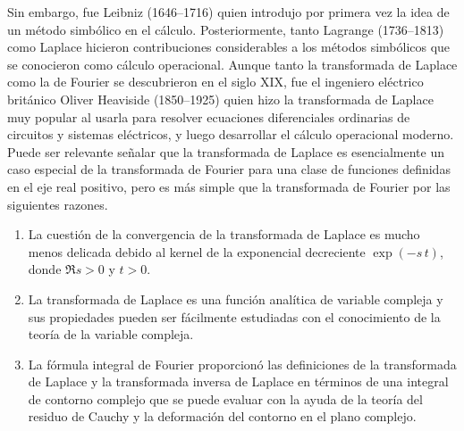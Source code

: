 \par
Sin embargo, fue Leibniz (1646–1716) quien introdujo por primera vez la idea de un método simbólico en el cálculo. Posteriormente, tanto Lagrange (1736–1813) como Laplace hicieron contribuciones considerables a los métodos simbólicos que se conocieron como cálculo operacional. Aunque tanto la transformada de Laplace como la de Fourier se descubrieron en el siglo XIX, fue el ingeniero eléctrico británico Oliver Heaviside (1850–1925) quien hizo la transformada de Laplace muy popular al usarla para resolver ecuaciones diferenciales ordinarias de circuitos y sistemas eléctricos, y luego desarrollar el cálculo operacional moderno. Puede ser relevante señalar que la transformada de Laplace es esencialmente un caso especial de la transformada de Fourier para una clase de funciones definidas en el eje real positivo, pero es más simple que la transformada de Fourier por las siguientes razones.
\begin{enumerate}
\item La cuestión de la convergencia de la transformada de Laplace es mucho menos delicada debido al kernel de la exponencial decreciente $\exp (-s \, t)$, donde $\Re{s} > 0$ y $t > 0$.
\item La transformada de Laplace es una función analítica de variable compleja y sus propiedades pueden ser fácilmente estudiadas con el conocimiento de la teoría de la variable compleja.
\item La fórmula integral de Fourier proporcionó las definiciones de la transformada de Laplace y la transformada inversa de Laplace en términos de una integral de contorno complejo que se puede evaluar con la ayuda de la teoría del residuo de Cauchy y la deformación del contorno en el plano complejo.
\end{enumerate}
